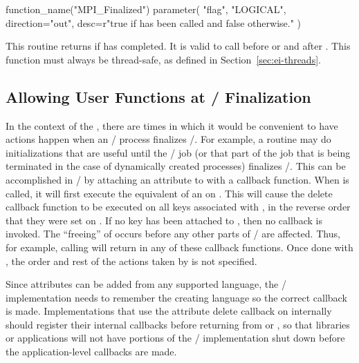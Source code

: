 \begin{mpi-binding}
    function_name("MPI_Finalized")
    parameter(
        "flag",
        "LOGICAL",
        direction="out",
        desc=r"true if  has been called and false otherwise."
    )
\end{mpi-binding}

This routine returns  if  has completed.
It is valid to call 
before  or  and after .
This function must always be thread-safe, as defined in
Section~\ref{sec:ei-threads}.

\subsection{Allowing User Functions at \texorpdfstring{\mpi/}{MPI} Finalization}
\label{subsec:inquiry-startup-userfunc}

In the context of the \wpm{}, there are times in which it would be convenient to have actions happen
when an \mpi/ process finalizes \MPI/.  For example, a routine may do
initializations that are useful until the \mpi/ job (or that part
of the job that is being terminated in the case of dynamically created
processes) finalizes \MPI/.  This can be accomplished in \mpi/ by
attaching an attribute to  with a callback
function.  When 
is called, it will first execute the equivalent of an
 on .
This will
cause the delete callback function to be executed on all keys
associated with , in the reverse order that
they were set on .  If no key has been
attached to , then no callback is invoked.
The ``freeing'' of  occurs before any other parts
of \MPI/ are affected.  Thus, for example, calling
 will return  in any of these
callback functions.  Once done with , the
order and rest of the actions taken by 
is not specified.

\begin{implementors}
Since attributes can be added from any supported language, the \mpi/
implementation needs to remember the creating language so the correct
callback is made.
Implementations that use the attribute delete callback on 
internally should register their internal callbacks before returning from
 or , so that libraries
or applications will not have portions of the \MPI/ implementation shut
down before the application-level callbacks are made.
\end{implementors}

